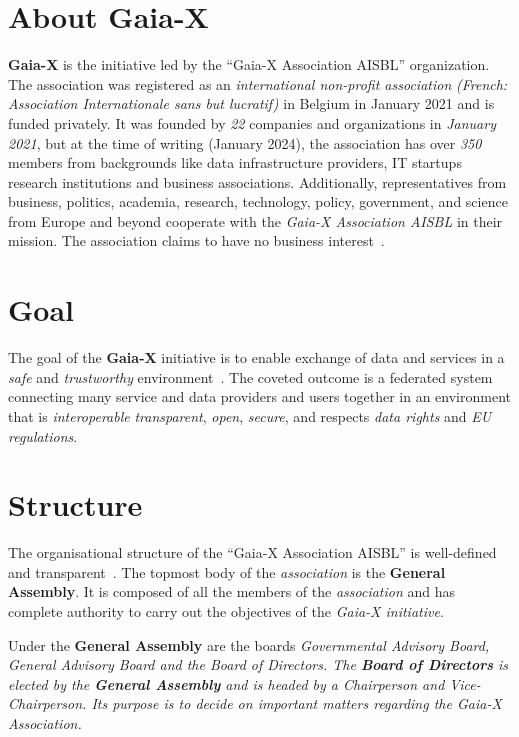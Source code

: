 \section{About Gaia-X}\label{sec:about-gaia-x}

\textbf{Gaia-X} is the initiative led by the ``Gaia-X Association AISBL'' organization.
The association was registered as an \textit{international non-profit association} \textit{(French: Association Internationale sans but lucratif)} in Belgium in January 2021 and is funded privately.
It was founded by \textit{22} companies and organizations in \textit{January 2021}, but at the time of writing (January 2024), the association has over \textit{350} members from backgrounds like data infrastructure providers, IT startups research institutions and business associations. %
Additionally, representatives from business, politics, academia, research, technology, policy, government, and science from Europe and beyond cooperate with the \textit{Gaia-X Association AISBL} in their mission.
The association claims to have no business interest~\cite{gaiax}.

\section{Goal}\label{sec:gaia-x-goal}

The goal of the \textbf{Gaia-X} initiative is to enable exchange of data and services in a \textit{safe} and \textit{trustworthy} environment~\cite{gaiax}.
The coveted outcome is a federated system connecting many service and data providers and users together in an environment that is \textit{interoperable} \textit{transparent}, \textit{open}, \textit{secure}, and respects \textit{data rights} and \textit{EU regulations}.

\section{Structure}\label{sec:the-structure}

The organisational structure of the ``Gaia-X Association AISBL'' is well-defined and transparent~\cite{gaiax}.
The topmost body of the \textit{association} is the \textbf{General Assembly}.
It is composed of all the members of the \textit{association} and has complete authority to carry out the objectives of the \textit{Gaia-X initiative}.

Under the \textbf{General Assembly} are the boards \em \textit{Governmental Advisory Board}, \textit{General Advisory Board} and the \textit{Board of Directors}.
The \textbf{Board of Directors} is elected by the \textbf{General Assembly} and is headed by a Chairperson and Vice-Chairperson.
Its purpose is to decide on important matters regarding the \textit{Gaia-X Association}.


